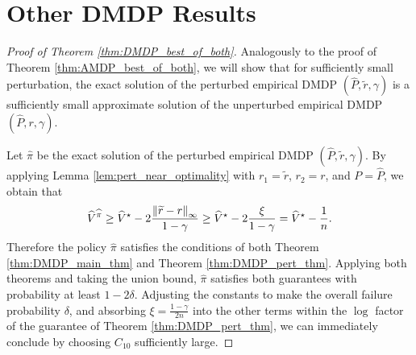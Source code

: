 \documentclass{article}
\theoremstyle{plain}
\theoremstyle{plain}
\theoremstyle{remark}
\theoremstyle{plain}
\theoremstyle{plain}
\newcommand{\Phat}{\widehat{P}}
\newcommand{\Vhat}{\widehat{V}}
\newcommand{\pihat}{\widehat{\pi}}
\begin{document}
\section{Other DMDP Results}
\label{sec:other_DMDP_results}
\begin{proof}[Proof of Theorem \ref{thm:DMDP_best_of_both}]
    Analogously to the proof of Theorem \ref{thm:AMDP_best_of_both}, we will show that for sufficiently small perturbation, the exact solution of the perturbed empirical DMDP $(\Phat, \widetilde{r}, \gamma)$ is a sufficiently small approximate solution of the unperturbed empirical DMDP $(\Phat, r, \gamma)$.

    Let $\pihat$ be the exact solution of the perturbed empirical DMDP $(\Phat, \widetilde{r}, \gamma)$. By applying Lemma \ref{lem:pert_near_optimality} with $r_1 = \widetilde{r}$, $r_2 = r$, and $P = \Phat$, we obtain that
    \[
    \Vhat^{\pihat} \geq \Vhat^\star - 2\frac{\infnorm{\widetilde{r} - r}}{1-\gamma} \geq \Vhat^\star - 2\frac{\xi}{1-\gamma} = \Vhat^\star - \frac{1}{n}.
    \]
    Therefore the policy $\pihat$ satisfies the conditions of both Theorem \ref{thm:DMDP_main_thm} and Theorem \ref{thm:DMDP_pert_thm}. Applying both theorems and taking the union bound, $\pihat$ satisfies both guarantees with probability at least $1 - 2\delta$. Adjusting the constants to make the overall failure probability $\delta$, and absorbing $\xi = \frac{1-\gamma}{2n}$ into the other terms within the $\log$ factor of the guarantee of Theorem \ref{thm:DMDP_pert_thm}, we can immediately conclude by choosing $C_{10}$ sufficiently large. 
\end{proof}
\end{document}
